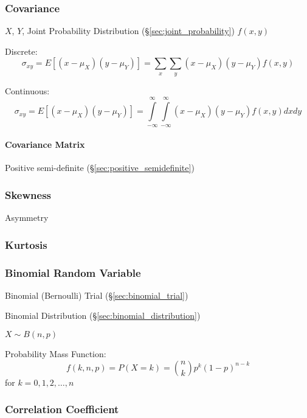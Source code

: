 \subsubsection{Covariance}\label{sec:covariance}

$X$, $Y$, Joint Probability Distribution
(\S\ref{sec:joint_probability}) $f(x,y)$

Discrete:
\[
  \sigma_{xy} = E [(x - \mu_X)(y - \mu_Y)] = \sum_x \sum_y (x - \mu_X)
  (y - \mu_Y) f(x,y)
\]

Continuous:
\[
  \sigma_{xy} = E [(x - \mu_X)(y - \mu_Y)] =
  \int\limits_{-\infty}^{\infty} \int\limits_{-\infty}^{\infty}
  (x - \mu_X) (y - \mu_Y) f(x,y) dx dy
\]



\paragraph{Covariance Matrix}\label{sec:covariance_matrix}\hfill

Positive semi-definite (\S\ref{sec:positive_semidefinite})



\subsubsection{Skewness}\label{sec:skewness}

Asymmetry %



\subsubsection{Kurtosis}\label{sec:kurtosis}

\subsubsection{Binomial Random Variable}\label{sec:binomial_random_variable}

Binomial (Bernoulli) Trial (\S\ref{sec:binomial_trial})

Binomial Distribution (\S\ref{sec:binomial_distribution})

$X \sim B(n,p)$

Probability Mass Function:
\[
  f(k,n,p) = P(X = k) = \binom{n}{k} p^k (1-p)^{n-k}
\]
for $k = 0,1,2, \ldots, n$



\subsubsection{Correlation Coefficient}\label{sec:correlation_coefficient}

